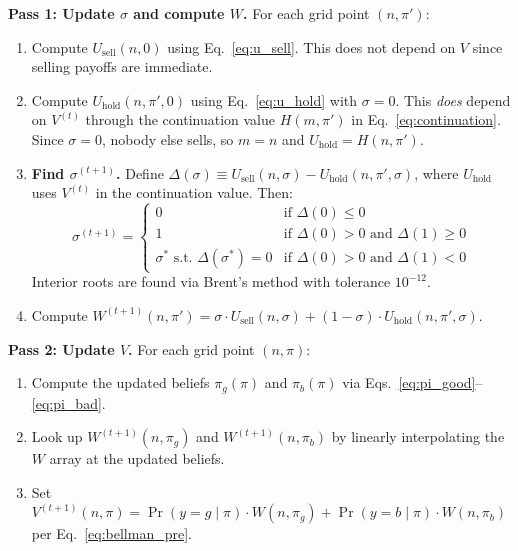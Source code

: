 \documentclass[11pt]{article}
\begin{document}
\textbf{Pass 1: Update $\sigma$ and compute $W$.} For each grid point
$(n, \pi')$:
\begin{enumerate}
    \item Compute $U_{\text{sell}}(n, 0)$ using Eq.~\eqref{eq:u_sell}. This
          does not depend on $V$ since selling payoffs are immediate.
    \item Compute $U_{\text{hold}}(n, \pi', 0)$ using Eq.~\eqref{eq:u_hold}
          with $\sigma = 0$. This \textit{does} depend on $V^{(t)}$ through
          the continuation value $H(m, \pi')$ in Eq.~\eqref{eq:continuation}.
          Since $\sigma = 0$, nobody else sells, so $m = n$ and
          $U_{\text{hold}} = H(n, \pi')$.
    \item \textbf{Find $\sigma^{(t+1)}$.} Define
          $\Delta(\sigma) \equiv U_{\text{sell}}(n, \sigma)
          - U_{\text{hold}}(n, \pi', \sigma)$, where $U_{\text{hold}}$
          uses $V^{(t)}$ in the continuation value. Then:
          \[
              \sigma^{(t+1)} =
              \begin{cases}
                  0 & \text{if } \Delta(0) \leq 0 \\
                  1 & \text{if } \Delta(0) > 0 \text{ and } \Delta(1) \geq 0 \\
                  \sigma^* \text{ s.t.\ } \Delta(\sigma^*) = 0
                    & \text{if } \Delta(0) > 0 \text{ and } \Delta(1) < 0
              \end{cases}
          \]
          Interior roots are found via Brent's method with tolerance
          $10^{-12}$.
    \item Compute $W^{(t+1)}(n, \pi') = \sigma \cdot U_{\text{sell}}(n, \sigma)
          + (1 - \sigma) \cdot U_{\text{hold}}(n, \pi', \sigma)$.
\end{enumerate}

\textbf{Pass 2: Update $V$.} For each grid point $(n, \pi)$:
\begin{enumerate}
    \item Compute the updated beliefs $\pi_g(\pi)$ and $\pi_b(\pi)$ via
          Eqs.~\eqref{eq:pi_good}--\eqref{eq:pi_bad}.
    \item Look up $W^{(t+1)}(n, \pi_g)$ and $W^{(t+1)}(n, \pi_b)$ by
          linearly interpolating the $W$ array at the updated beliefs.
    \item Set $V^{(t+1)}(n, \pi) = \Pr(y{=}g \mid \pi) \cdot W(n, \pi_g)
          + \Pr(y{=}b \mid \pi) \cdot W(n, \pi_b)$ per
          Eq.~\eqref{eq:bellman_pre}.
\end{enumerate}
\end{document}
